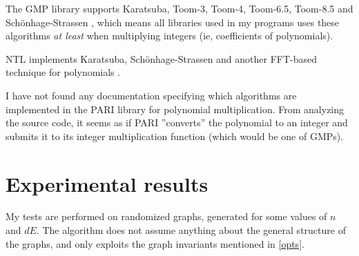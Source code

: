 \documentclass[a4paper]{article}
\begin{document}


The GMP library supports Karatsuba, Toom-3, Toom-4, Toom-6.5, Toom-8.5 and Schönhage-Strassen \cite[p 90]{gmp}, which means all libraries used in my programs uses these algorithms \emph{at least} when multiplying integers (ie, coefficients of polynomials).

NTL implements Karatsuba, Schönhage-Strassen and another FFT-based technique for polynomials \cite{ntl_zzx}.

I have not found any documentation specifying which algorithms are implemented in the PARI library for polynomial multiplication. From analyzing the source code, it seems as if PARI ''converts'' the polynomial to an integer and submits it to its integer multiplication function (which would be one of GMPs).

\section{Experimental results}
My tests are performed on randomized graphs, generated for some values of $n$ and $dE$. The algorithm does not assume anything about the general structure of the graphs, and only exploits the graph invariants mentioned in \ref{opts}.
\end{document}

